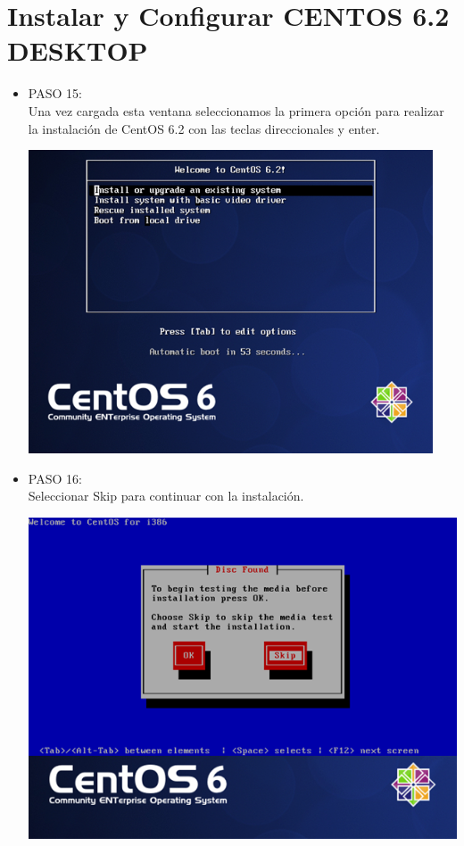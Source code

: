 
\section{Instalar y Configurar CENTOS 6.2 DESKTOP}

\begin{itemize}
\item PASO 15:
\\Una vez cargada esta ventana seleccionamos la primera opción para realizar la instalación de CentOS 6.2  con las teclas direccionales y enter.
		\begin{center}
		\includegraphics[width=12cm]{./Imagenes/15}
		\end{center}
	
	\end{itemize} 

\begin{itemize}
\item PASO 16:
\\Seleccionar Skip para continuar con la instalación.
		\begin{center}
		\includegraphics[width=13cm]{./Imagenes/16}
		\end{center}
	
	\end{itemize} 

